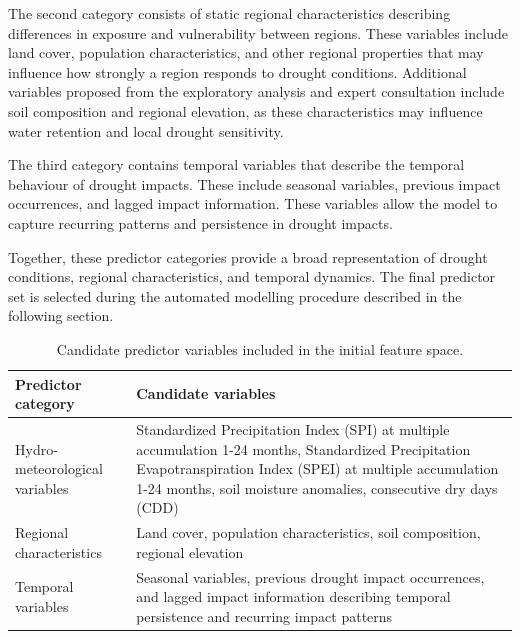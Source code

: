 The second category consists of static regional characteristics describing differences in exposure and vulnerability between regions. These variables include land cover, population characteristics, and other regional properties that may influence how strongly a region responds to drought conditions. Additional variables proposed from the exploratory analysis and expert consultation include soil composition and regional elevation, as these characteristics may influence water retention and local drought sensitivity.

The third category contains temporal variables that describe the temporal behaviour of drought impacts. These include seasonal variables, previous impact occurrences, and lagged impact information. These variables allow the model to capture recurring patterns and persistence in drought impacts.

Together, these predictor categories provide a broad representation of drought conditions, regional characteristics, and temporal dynamics. The final predictor set is selected during the automated modelling procedure described in the following section.

\begin{table}[h]
\centering
\small
\caption{Candidate predictor variables included in the initial feature space.}
\label{tab:predictor_space}
\begin{tabular}{p{3.5cm} p{10.5cm}}
\toprule
\textbf{Predictor category} & \textbf{Candidate variables} \\
\midrule

Hydro-meteorological variables &
Standardized Precipitation Index (SPI) at multiple accumulation 1-24 months, 
Standardized Precipitation Evapotranspiration Index (SPEI) at multiple accumulation 1-24 months, 
soil moisture anomalies, consecutive dry days (CDD)\\

Regional characteristics &
Land cover, population characteristics, soil composition, regional elevation \\

Temporal variables &
Seasonal variables, previous drought impact occurrences, and lagged impact information 
describing temporal persistence and recurring impact patterns \\

\bottomrule
\end{tabular}
\end{table}





